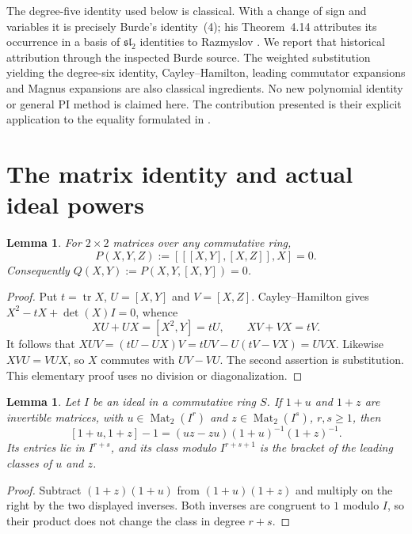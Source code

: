 \documentclass[11pt,letterpaper]{article}
\newtheorem{lemma}[theorem]{Lemma}
\newcommand{\Mat}{\operatorname{Mat}}
\begin{document}
The degree-five identity used below is classical. With a change of sign and
variables it is precisely Burde's identity~(4); his Theorem~4.14 attributes
its occurrence in a basis of $\mathfrak{sl}_2$ identities to Razmyslov
\cite{Burde}. We report that historical attribution through the inspected
Burde source. The weighted substitution yielding the degree-six identity,
Cayley--Hamilton, leading commutator expansions and Magnus expansions are
also classical ingredients. No new polynomial identity or general PI method
is claimed here. The contribution presented is their explicit application
to the equality formulated in \cite{SatohOWR}.

\section{The matrix identity and actual ideal powers}
\begin{lemma}\label{lem:pi}
For $2\times2$ matrices over any commutative ring,
\[
 P(X,Y,Z):=[[[X,Y],[X,Z]],X]=0.
\]
Consequently $Q(X,Y):=P(X,Y,[X,Y])=0$.
\end{lemma}
\begin{proof}
Put $t=\operatorname{tr}X$, $U=[X,Y]$ and $V=[X,Z]$.
Cayley--Hamilton gives $X^2-tX+\det(X)I=0$, whence
\[
 XU+UX=[X^2,Y]=tU,\qquad XV+VX=tV.
\]
It follows that
$XUV=(tU-UX)V=tUV-U(tV-VX)=UVX$.
Likewise $XVU=VUX$, so $X$ commutes with $UV-VU$.
The second assertion is substitution. This elementary proof uses no division
or diagonalization.
\end{proof}

\begin{lemma}\label{lem:filtered}
Let $I$ be an ideal in a commutative ring $S$. If $1+u$ and $1+z$ are
invertible matrices, with $u\in\Mat_2(I^r)$ and $z\in\Mat_2(I^s)$,
$r,s\geq1$, then
\[
 [1+u,1+z]-1=(uz-zu)(1+u)^{-1}(1+z)^{-1}.
\]
Its entries lie in $I^{r+s}$, and its class modulo $I^{r+s+1}$ is the
bracket of the leading classes of $u$ and $z$.
\end{lemma}
\begin{proof}
Subtract $(1+z)(1+u)$ from $(1+u)(1+z)$ and multiply on the right by the
two displayed inverses. Both inverses are congruent to $1$ modulo $I$,
so their product does not change the class in degree $r+s$.
\end{proof}
\end{document}
